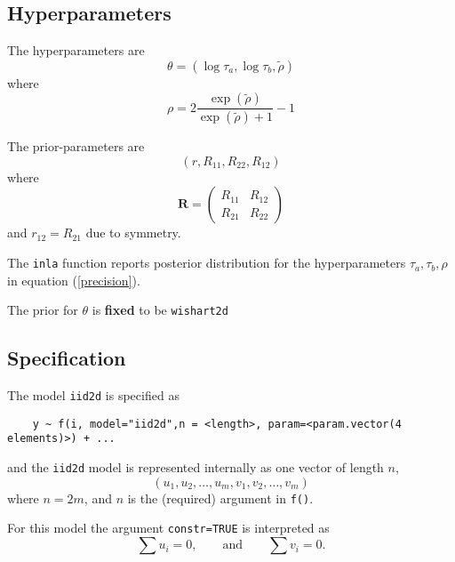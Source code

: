 \documentclass[a4paper,11pt]{article}
\begin{document}
\subsection*{Hyperparameters}

The hyperparameters are
\begin{displaymath}
    \theta = (\log\tau_{a}, \log\tau_{b}, \tilde\rho)
\end{displaymath}
where
\begin{displaymath}
    \rho =
    2\frac{\exp(\tilde\rho)}{\exp(\tilde{\rho})+1} -1
\end{displaymath}

The prior-parameters are
\begin{displaymath}
    (r,R_{11},R_{22},R_{12})
\end{displaymath}
where
\begin{displaymath}
    \mathbf{R}= \left(\begin{array}{cc}
          R_{11} &R_{12}\\
          R_{21} & R_{22}
      \end{array}\right)
\end{displaymath}
and $r_{12}=R_{21}$ due to symmetry.

The {\tt inla} function reports posterior distribution for the
hyperparameters $\tau_a,\tau_b,\rho$ in equation (\ref{precision}).

The prior for $\theta$ is {\bf fixed} to be {\tt wishart2d}


\subsection*{Specification}

The model \texttt{iid2d}
is specified as
\begin{verbatim}
    y ~ f(i, model="iid2d",n = <length>, param=<param.vector(4 elements)>) + ...
\end{verbatim}
and the \texttt{iid2d} model is represented internally as one vector
of length $n$,
\begin{displaymath}
    (u_{1}, u_{2}, \ldots, u_{m}, v_{1}, v_{2}, \ldots, v_{m})
\end{displaymath}
where $n = 2m$, and $n$ is the (required) argument in
\texttt{f()}.

For this model the argument \texttt{constr=TRUE} is interpreted as
\begin{displaymath}
    \sum u_{i} = 0, \qquad\text{and}\qquad \sum v_{i} = 0.
\end{displaymath}
\end{document}
